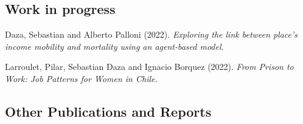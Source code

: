 \documentclass[10pt,letterpaper]{article}
\renewenvironment{itemize}{
  \begin{list}{}{
    \setlength{\leftmargin}{1.5em}
    \setlength{\itemsep}{0.25em}
    \setlength{\parskip}{0pt}
    \setlength{\parsep}{0.25em}
  }
}{
  \end{list}
}
\begin{document}
\subsection*{Work in progress}

\begin{itemize}

\item Daza, Sebastian and Alberto Palloni (2022). {\textit{Exploring the link between place's income mobility and mortality using an agent-based model.}}

\item Larroulet, Pilar, Sebastian Daza and Ignacio Borquez (2022). {\textit{From Prison to Work: Job Patterns for Women in Chile.}}

\end{itemize}

\subsection*{Other Publications and Reports}
\end{document}
